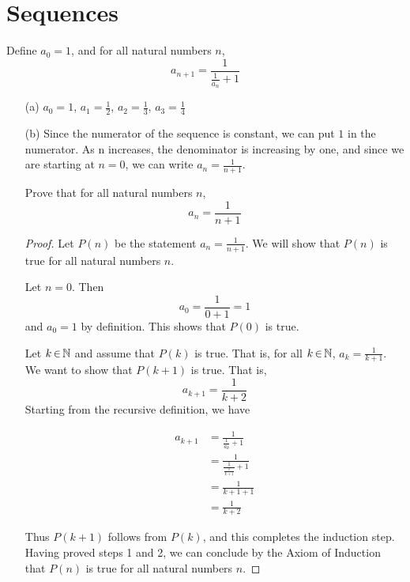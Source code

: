 \documentclass[12pt, a4paper]{amsart}
\theoremstyle{definition}
\theoremstyle{remark}
\numberwithin{Theorem}{section}
\begin{document}
\newpage


\section{Sequences}

Define $a_0 = 1$, and for all natural numbers $n$, $$a_{n+1} = \frac{1}{\frac{1}{a_n} + 1}$$

\begin{enumerate}

    \item[(a)] $a_0 = 1$, $a_1 = \frac{1}{2}$, $a_2 = \frac{1}{3}$, $a_3 = \frac{1}{4}$
    
    \item[(b)] Since the numerator of the sequence is constant, we can put $1$ in the
    numerator. As n increases, the denominator is increasing by one, and since we are 
    starting at $n = 0$, we can write $a_n = \frac{1}{n + 1}$.
    
    Prove that for all natural numbers $n$, $$a_n = \frac{1}{n + 1}$$
    
    \begin{proof}
    
    Let $P(n)$ be the statement $a_n = \frac{1}{n + 1}$.
    We will show that $P(n)$ is true for all natural numbers $n$.
    
    \base
    
    Let $n = 0$. Then $$a_0 = \frac{1}{0 + 1} = 1$$ 
    and $a_0 = 1$ by definition. This shows that $P(0)$ is true.
    
    \istep
    
    Let $k \,{\in}\, \mathbb N$ and assume that $P(k)$ is true. That is, 
    for all $k \,{\in}\, \mathbb N$, $a_k = \frac{1}{k + 1}$.
    We want to show that $P(k + 1)$ is true. That is, 
    $$a_{k+1} = \frac{1}{k + 2}$$
    Starting from the recursive definition, we have
    
    \begin{align*}
        a_{k+1} &= \frac{1}{\frac{1}{a_k} + 1} \\
        &= \frac{1}{\frac{1}{\frac{1}{k+1}} + 1} \tag{By the induction hypothesis} \\
        &= \frac{1}{k+1 + 1} \\
        &= \frac{1}{k+2}
    \end{align*}
    
    Thus $P(k + 1)$ follows from $P(k)$, and this completes the induction step. Having
    proved steps 1 and 2, we can conclude by the Axiom of Induction
    that $P(n)$ is true for all natural numbers $n$.
    
    \end{proof}

\end{enumerate}
\end{document}
